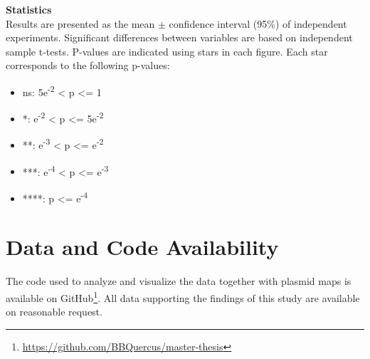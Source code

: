 \textbf{Statistics} \\
Results are presented as the mean $\pm$ confidence interval (95\%) of independent experiments.
Significant differences between variables are based on independent sample t-tests.
P-values are indicated using stars in each figure.
Each star corresponds to the following p-values:
\begin{itemize}
    \itemsep0em 
    \item ns: 5e\textsuperscript{-2} < p <= 1
    \item *: e\textsuperscript{-2} < p <= 5e\textsuperscript{-2}
    \item **: e\textsuperscript{-3} < p <= e\textsuperscript{-2}
    \item ***: e\textsuperscript{-4} < p <= e\textsuperscript{-3}
    \item ****: p <= e\textsuperscript{-4}
\end{itemize}

\section{Data and Code Availability}
The code used to analyze and visualize the data together with plasmid maps is available on GitHub\footnote{\href{https://github.com/BBQuercus/master-thesis}{https://github.com/BBQuercus/master-thesis}}.
All data supporting the findings of this study are available on reasonable request.
